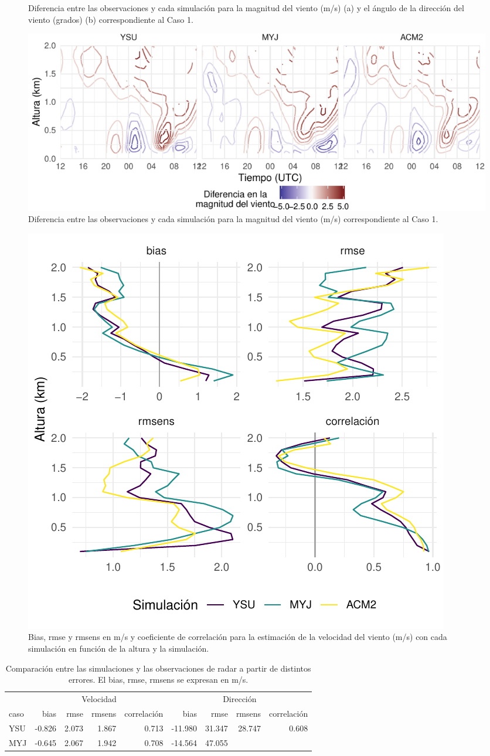 \documentclass[12pt,spanish,oneside, a4paper]{book}
\begin{document}
\begin{figure}
\caption{Diferencia entre las observaciones y cada simulación para la magnitud del viento (m/s) (a) y el ángulo de la dirección del viento (grados) (b) correspondiente al Caso 1. \label{dif}}\label{fig:diferencia}
\end{figure}

\begin{figure}
\centering
\includegraphics{00_Paper_files/figure-latex/diff_spd-1.pdf}
\caption{Diferencia entre las observaciones y cada simulación para la
magnitud del viento (m/s) correspondiente al Caso 1. \label{dif}}
\end{figure}

\begin{figure}

{\centering \includegraphics{00_Paper_files/figure-latex/err-spd-1} 

}

\caption{Bias, rmse y rmsens en m/s y coeficiente de correlación para la estimación de la velocidad del viento (m/s) con cada simulación en función de la altura y la simulación. \label{err-spd}}\label{fig:err-spd}
\end{figure}

\begin{table}

\caption{\label{tab:err-tabla}Comparación entre las simulaciones y las observaciones de radar a partir de distintos errores. El bias, rmse, rmsens se expresan en m/s. \label{err}}
\centering
\begin{tabular}[t]{lrrrrrrrr}
\toprule
\multicolumn{1}{c}{ } & \multicolumn{4}{c}{Velocidad} & \multicolumn{4}{c}{Dirección} \\
\cmidrule(l{2pt}r{2pt}){2-5} \cmidrule(l{2pt}r{2pt}){6-9}
caso & bias & rmse & rmsens & correlación & bias & rmse & rmsens & correlación\\
\midrule
YSU & -0.826 & 2.073 & 1.867 & 0.713 & -11.980 & 31.347 & 28.747 & 0.608\\
MYJ & -0.645 & 2.067 & 1.942 & 0.708 & -14.564 & 47.055 &
\end{tabular}
\end{table}
\end{document}
